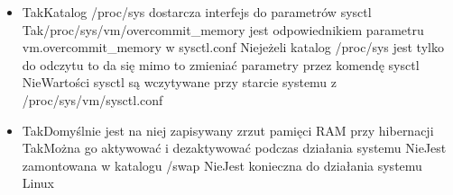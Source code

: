 \begin{itemize}
	\item {}%
	{Tak}{Katalog /proc/sys dostarcza interfejs do parametrów sysctl}%
	{Tak}{/proc/sys/vm/overcommit\_memory jest odpowiednikiem parametru vm.overcommit\_memory w sysctl.conf}%
	{Nie}{jeżeli katalog /proc/sys jest tylko do odczytu to da się mimo to zmieniać parametry przez komendę sysctl}%
	{Nie}{Wartości sysctl są wczytywane przy starcie systemu z /proc/sys/vm/sysctl.conf}
	
	\item {}%
	{Tak}{Domyślnie jest na niej zapisywany zrzut pamięci RAM przy hibernacji}%
	{Tak}{Można go aktywować i dezaktywować podczas działania systemu}%
	{Nie}{Jest zamontowana w katalogu /swap}%
	{Nie}{Jest konieczna do działania systemu Linux}
	
	
	
\end{itemize}